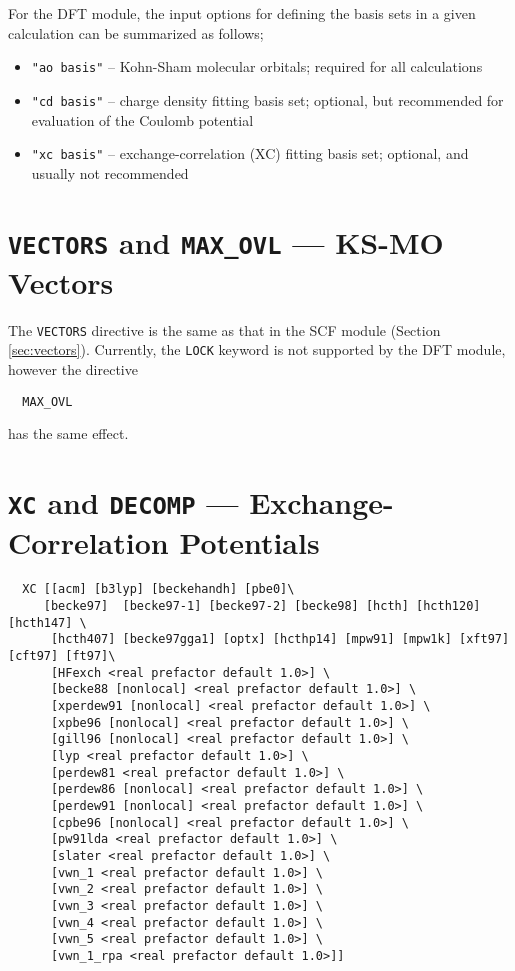 For the DFT module, the input options for defining the basis sets in a given
calculation can be summarized as follows;
\begin{itemize}
\item {\tt "ao basis"} -- Kohn-Sham molecular orbitals; required for all 
calculations
\item {\tt "cd basis"} -- charge density fitting basis set; optional, but
recommended for evaluation of the Coulomb potential
\item {\tt "xc basis"} -- exchange-correlation (XC) fitting basis set; 
optional, and usually not recommended
\end{itemize}


\section{{\tt VECTORS} and {\tt MAX\_OVL} --- KS-MO Vectors}

The \verb+VECTORS+ directive is the same as that in the SCF module
(Section \ref{sec:vectors}).  Currently, the \verb+LOCK+ keyword
is not supported by the DFT module, however the directive
\begin{verbatim}
  MAX_OVL
\end{verbatim}
has the same effect.

\section{{\tt XC} and {\tt DECOMP} --- Exchange-Correlation Potentials}
\label{sec:xc}
\begin{verbatim}
  XC [[acm] [b3lyp] [beckehandh] [pbe0]\
     [becke97]  [becke97-1] [becke97-2] [becke98] [hcth] [hcth120] [hcth147] \
      [hcth407] [becke97gga1] [optx] [hcthp14] [mpw91] [mpw1k] [xft97] [cft97] [ft97]\
      [HFexch <real prefactor default 1.0>] \
      [becke88 [nonlocal] <real prefactor default 1.0>] \
      [xperdew91 [nonlocal] <real prefactor default 1.0>] \
      [xpbe96 [nonlocal] <real prefactor default 1.0>] \
      [gill96 [nonlocal] <real prefactor default 1.0>] \
      [lyp <real prefactor default 1.0>] \
      [perdew81 <real prefactor default 1.0>] \
      [perdew86 [nonlocal] <real prefactor default 1.0>] \
      [perdew91 [nonlocal] <real prefactor default 1.0>] \
      [cpbe96 [nonlocal] <real prefactor default 1.0>] \
      [pw91lda <real prefactor default 1.0>] \
      [slater <real prefactor default 1.0>] \
      [vwn_1 <real prefactor default 1.0>] \
      [vwn_2 <real prefactor default 1.0>] \
      [vwn_3 <real prefactor default 1.0>] \
      [vwn_4 <real prefactor default 1.0>] \
      [vwn_5 <real prefactor default 1.0>] \
      [vwn_1_rpa <real prefactor default 1.0>]]
\end{verbatim}

